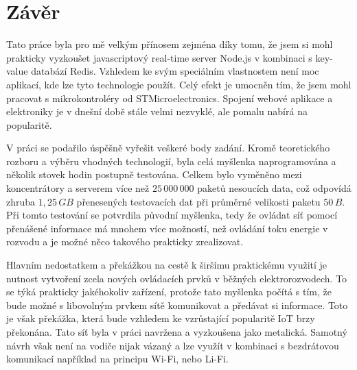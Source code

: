 \chapter{Závěr}
Tato práce byla pro mě velkým přínosem zejména díky tomu, že jsem si mohl prakticky vyzkoušet javascriptový real-time server Node.js v kombinaci s key-value databází Redis. Vzhledem ke svým speciálním vlastnostem není moc aplikací, kde lze tyto technologie použít. Celý efekt je umocněn tím, že jsem  mohl pracovat s mikrokontroléry od STMicroelectronics. Spojení webové aplikace a elektroniky je v dnešní době stále velmi nezvyklé, ale pomalu nabírá na popularitě.

V práci se podařilo úspěšně vyřešit veškeré body zadání. Kromě teoretického rozboru a výběru vhodných technologií, byla celá myšlenka naprogramována a několik stovek hodin postupně testována. Celkem bylo vyměněno mezi koncentrátory a serverem více než $25\,000\,000$ paketů nesoucích data, což odpovídá zhruba $1,25\,GB$ přenesených testovacích dat při průměrné velikosti paketu $50\,B$. Při tomto testování se potvrdila původní myšlenka, tedy že ovládat síť pomocí přenášené informace má mnohem více možností, než ovládání toku energie v rozvodu a je možné něco takového prakticky zrealizovat.

Hlavním nedostatkem a překážkou na cestě k širšímu praktickému využití je nutnost vytvoření zcela nových ovládacích prvků v běžných elektrorozvodech. To se týká prakticky jakéhokoliv zařízení, protože tato myšlenka počítá s tím, že bude možné s libovolným prvkem sítě komunikovat a předávat si informace. Toto je však překážka, která bude vzhledem ke vzrůstající popularitě IoT brzy překonána. Tato síť byla v práci navržena a vyzkoušena jako metalická. Samotný návrh však není na vodiče nijak vázaný a lze využít v kombinaci s bezdrátovou komunikací například na principu Wi-Fi, nebo Li-Fi.